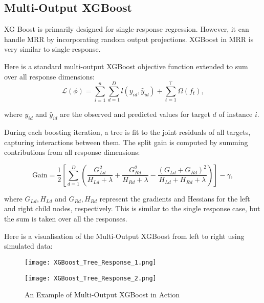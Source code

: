 \subsection{Multi-Output XGBoost}
XG Boost is primarily designed for single-response regression. However, it can handle MRR by incorporating random output projections. XGBoost in MRR is very similar to single-response.

Here is a standard multi-output XGBoost objective function extended to sum over all response dimensions:
\begin{equation*}
\mathcal{L}(\phi) = \sum_{i=1}^n \sum_{d=1}^D l(y_{id}, \hat{y}_{id}) + \sum_{t=1}^\top \Omega(f_t),
\end{equation*}

\noindent where $y_{id}$ and $\hat{y}_{id}$ are the observed and predicted values for target $d$ of instance $i$.\cite{9158536}

\noindent During each boosting iteration, a tree is fit to the joint residuals of all targets, capturing interactions between them. The split gain is computed by summing contributions from all response dimensions:

\begin{equation*}
\text{Gain} = \frac{1}{2} \left[ \sum_{d=1}^D \left( \frac{G_{Ld}^2}{H_{Ld} + \lambda} + \frac{G_{Rd}^2}{H_{Rd} + \lambda} - \frac{(G_{Ld} + G_{Rd})^2}{H_{Ld} + H_{Rd} + \lambda} \right) \right] - \gamma,
\end{equation*}

\noindent where $G_{Ld}, H_{Ld}$ and $G_{Rd}, H_{Rd}$ represent the gradients and Hessians for the left and right child nodes, respectively.\cite{9158536} This is similar to the single response case, but the sum is taken over all the responses.

Here is a visualisation of the Multi-Output XGBoost from left to right using simulated data:

\begin{figure}[H]
    \centering
    \begin{minipage}{0.49\textwidth}
        \centering
        \texttt{[image: XGBoost\_Tree\_Response\_1.png]}
    \end{minipage}
    \hfill
    \begin{minipage}{0.49\textwidth}
        \centering
        \texttt{[image: XGBoost\_Tree\_Response\_2.png]}
    \end{minipage}
    \caption{An Example of Multi-Output XGBoost in Action}
\end{figure}

